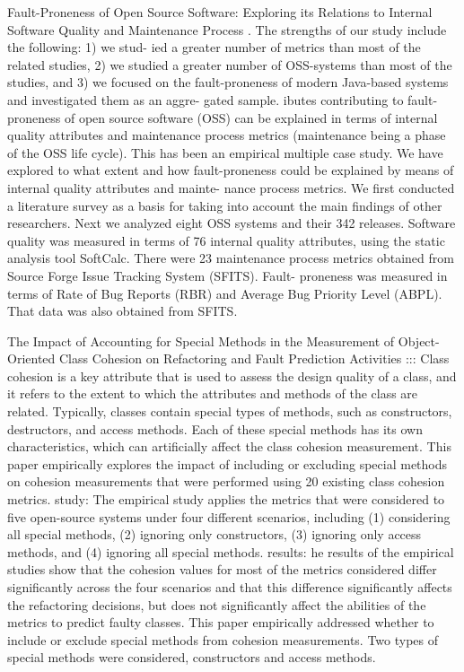 Fault-Proneness of Open Source Software: Exploring its Relations to
Internal Software Quality and Maintenance Process \cite{kozlov2013fault}. The strengths of our study include the following: 1) we stud-
ied a greater number of metrics than most of the related studies, 2) we studied a greater number of OSS-systems than most
of the studies, and 3) we focused on the fault-proneness of modern Java-based systems and investigated them as an aggre-
gated sample.
ibutes contributing to fault-proneness of open source
software (OSS) can be explained in terms of internal quality
attributes and maintenance process metrics (maintenance
being a phase of the OSS life cycle).
This has been an empirical multiple case study. We have
explored to what extent and how fault-proneness could be
explained by means of internal quality attributes and mainte-
nance process metrics. We first conducted a literature survey
as a basis for taking into account the main findings of other
researchers. Next we analyzed eight OSS systems and their
342 releases.
Software quality was measured in terms of 76 internal
quality attributes, using the static analysis tool SoftCalc.
There were 23 maintenance process metrics obtained from
Source Forge Issue Tracking System (SFITS). Fault-
proneness was measured in terms of Rate of Bug Reports
(RBR) and Average Bug Priority Level (ABPL). That data
was also obtained from SFITS.

The Impact of Accounting for Special Methods in the Measurement of
Object-Oriented Class Cohesion on Refactoring and Fault Prediction
Activities ::: \cite{b4al2012impact}
Class cohesion is a key attribute that is used to assess the design quality of a class, and it
refers to the extent to which the attributes and methods of the class are related. Typically,
classes contain special types of methods, such as constructors, destructors, and access
methods. Each of these special methods has its own characteristics, which can artificially
affect the class cohesion measurement.
This paper empirically explores the impact of including or
excluding special methods on cohesion measurements that were performed using 20
existing class cohesion metrics.
study: The empirical study applies the metrics that were
considered to five open-source systems under four different scenarios, including (1)
considering all special methods, (2) ignoring only constructors, (3) ignoring only access
methods, and (4) ignoring all special methods.
results: he results of
the empirical studies show that the cohesion values for most of the metrics considered
differ significantly across the four scenarios and that this difference significantly affects
the refactoring decisions, but does not significantly affect the abilities of the metrics to predict faulty classes.
This paper empirically addressed whether to include or exclude special methods from
cohesion measurements. Two types of special methods were considered, constructors and
access methods.


